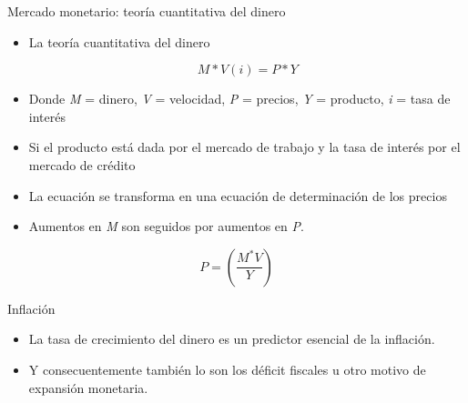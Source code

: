 \documentclass{beamer}
\begin{document}

\begin{frame}{Mercado monetario: teoría cuantitativa del dinero}

    \begin{itemize}
        \item La teoría cuantitativa del dinero
        
        \vspace{0.3cm}
        
                \begin{tcolorbox}[width=4in,
                  interior hidden,
                  boxsep=0pt,
                  left=0pt,
                  right=0pt,
                  top=2pt,
                  ]%
                                 $$M*V(i)=P*Y$$
                \end{tcolorbox} 
        
        \item Donde \textit{M} = dinero, \textit{V} = velocidad, \textit{P} = precios, \textit{Y} = producto, \textit{i} = tasa de interés
        \item Si el producto está dada por el mercado de trabajo y la tasa de interés por el mercado de crédito
        \item La ecuación se transforma en una ecuación de determinación de los precios
        \item Aumentos en \textit{M} son seguidos por aumentos en \textit{P}.

    \end{itemize}
    \begin{itemize}
    
                    \begin{tcolorbox}[width=4in,
                  interior hidden,
                  boxsep=0pt,
                  left=0pt,
                  right=0pt,
                  top=2pt,
                  ]%
                                 $$P=\left(\frac{M^{*} V}{Y}\right)$$
                \end{tcolorbox} 
     \end{itemize}
\end{frame}


\begin{frame}{Inflación}

    \begin{itemize}
        \item La tasa de crecimiento del dinero es un predictor esencial de la inflación.
        \item Y consecuentemente también lo son los déficit fiscales u otro motivo de expansión monetaria.
    \end{itemize}

\end{frame}
\end{document}

